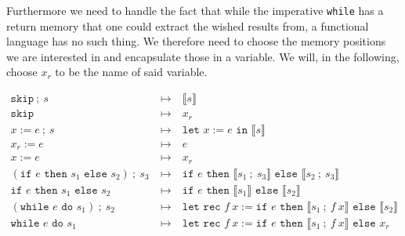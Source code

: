 \documentclass[11pt, leqno]{article}
\begin{document}
Furthermore we need to handle the fact that while the imperative \texttt{while} has a
return memory that one could extract the wished results from, a functional language
has no such thing. We therefore need to choose the memory positions we are interested
in and encapsulate those in a variable. We will, in the following, choose $x_r$ to be
the name of said variable. 

\begin{align}
  \label{eq:transwhile}
  \texttt{skip}~;~s & ~\mapsto~ & \llbracket s \rrbracket\\
  \texttt{skip}     & ~\mapsto~ & x_r\\
  x := e~;~s        & ~\mapsto~ & \texttt{let } x := e \texttt{ in }\llbracket s \rrbracket\\
  x_r := e          & ~\mapsto~ & e \\
  x := e            & ~\mapsto~ & x_r \\
  (\texttt{if } e \texttt{ then } s_1 \texttt{ else } s_2) ~;~s_3
                    & ~\mapsto~ & \texttt{if } e
                                  \texttt{ then } \llbracket s_1 ~;~ s_3 \rrbracket
                                  \texttt{ else } \llbracket s_2 ~;~ s_3 \rrbracket \\
  \texttt{if } e \texttt{ then } s_1 \texttt{ else } s_2
                    & ~\mapsto~ & \texttt{if } e
                                  \texttt{ then } \llbracket s_1 \rrbracket
                                  \texttt{ else } \llbracket s_2 \rrbracket \\
  (\texttt{while } e \texttt{ do } s_1) ~;~ s_2
                    & ~\mapsto~ & \texttt{let rec } f~x :=
                                  \texttt{if } e
                                  \texttt{ then } \llbracket s_1 ~;~ f~x \rrbracket
                                  \texttt{ else } \llbracket s_2 \rrbracket \\
  \texttt{while } e \texttt{ do } s_1
                    & ~\mapsto~ & \texttt{let rec } f~x :=
                                  \texttt{if } e
                                  \texttt{ then } \llbracket s_1 ~;~ f~x \rrbracket
                                  \texttt{ else } x_r 
\end{align}
\end{document}
